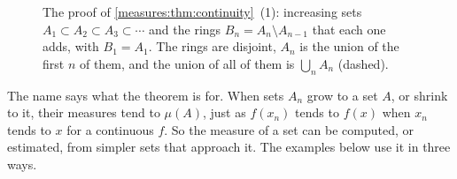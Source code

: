 \begin{notechapter}
\begin{figure}[ht]
\centering
{}
\caption{The proof of \cref{measures:thm:continuity}~(1): increasing
sets $A_1\subset A_2\subset A_3\subset\cdots$ and the rings
$B_n = A_n\setminus A_{n-1}$ that each one adds, with $B_1 = A_1$. The
rings are disjoint, $A_n$ is the union of the first $n$ of them, and
the union of all of them is $\bigcup_nA_n$ (dashed).}
\label{measures:fig:rings}
\end{figure}

The name says what the theorem is for. When sets $A_n$ grow to a set
$A$, or shrink to it, their measures tend to $\mu(A)$, just as $f(x_n)$
tends to $f(x)$ when $x_n$ tends to $x$ for a continuous $f$. So the
measure of a set can be computed, or estimated, from simpler sets that
approach it. The examples below use it in three ways.


\end{notechapter}
